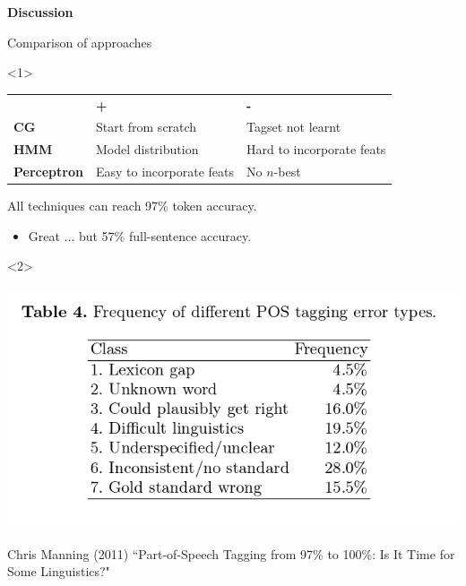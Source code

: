\documentclass{beamer}
\begin{document}

\begin{frame}

\centering
{\LARGE {\bf Discussion} }

\end{frame}

\begin{frame}{Comparison of approaches}


\begin{onlyenv}<1>
\begin{center}
\begin{tabular}{lll}
   & \textbf{+} & \textbf{-}  \\
\textbf{CG} & Start from scratch & Tagset not learnt \\
\textbf{HMM} & Model distribution & Hard to incorporate feats \\
\textbf{Perceptron} & Easy to incorporate feats & No $n$-best  \\
\end{tabular}
\end{center}

All techniques can reach 97\% token accuracy.
\begin{itemize}
  \item Great ... but 57\% full-sentence accuracy.
\end{itemize}
\end{onlyenv}
\begin{onlyenv}<2>

\includegraphics[width=\textwidth]{images/manning-errors.png}
~\\
Chris Manning (2011) ``Part-of-Speech Tagging from 97\% to 100\%: Is It Time for Some Linguistics?"
\end{onlyenv}


\end{frame}
\end{document}
